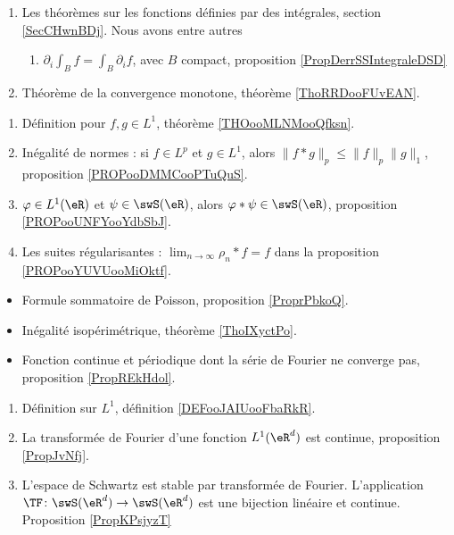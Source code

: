 \begin{enumerate}
    \item 
        Les théorèmes sur les fonctions définies par des intégrales, section \ref{SecCHwnBDj}. Nous avons entre autres
        \begin{enumerate}
            \item
                \( \partial_i\int_Bf=\int_B\partial_if\), avec \( B\) compact, proposition \ref{PropDerrSSIntegraleDSD}
        \end{enumerate}
    \item 
        Théorème de la convergence monotone, théorème \ref{ThoRRDooFUvEAN}.
\end{enumerate}

\begin{enumerate}
    \item
        Définition pour \( f,g\in L^1\), théorème \ref{THOooMLNMooQfksn}.
    \item
        Inégalité de normes : si \( f\in L^p\) et \( g\in L^1\), alors \( \| f*g \|_p\leq \| f \|_p\| g \|_1\), proposition \ref{PROPooDMMCooPTuQuS}.
    \item
        \( \varphi\in L^1(\eR)\) et \( \psi\in\swS(\eR)\), alors \( \varphi * \psi\in \swS(\eR)\), proposition \ref{PROPooUNFYooYdbSbJ}.
    \item
        Les suites régularisantes : \( \lim_{n\to \infty} \rho_n*f=f\) dans la proposition \ref{PROPooYUVUooMiOktf}.
\end{enumerate}

\begin{itemize}
    \item Formule sommatoire de Poisson, proposition \ref{ProprPbkoQ}.
    \item Inégalité isopérimétrique, théorème \ref{ThoIXyctPo}.
    \item Fonction continue et périodique dont la série de Fourier ne converge pas, proposition \ref{PropREkHdol}.
\end{itemize}

\begin{enumerate}
    \item
        Définition sur \( L^1\), définition \ref{DEFooJAIUooFbaRkR}.
    \item
        La transformée de Fourier d'une fonction \( L^1(\eR^d)\) est continue, proposition \ref{PropJvNfj}.
    \item
    L'espace de Schwartz est stable par transformée de Fourier. L'application $\TF\colon \swS(\eR^d)\to \swS(\eR^d)$ est une bijection linéaire et continue. Proposition  \ref{PropKPsjyzT}
\end{enumerate}

